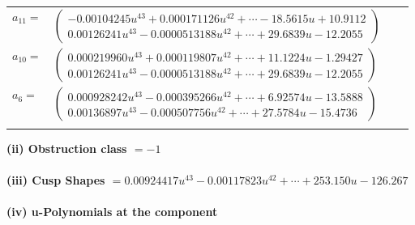 \documentclass[1p]{elsarticle_modified}
\theoremstyle{definition}
\begin{document}
\begin{tabular}{m{7pt} m{180pt} m{7pt} m{180pt} }
\flushright $a_{11}=$&$\begin{pmatrix}-0.00104245 u^{43}+0.000171126 u^{42}+\cdots-18.5615 u+10.9112\\0.00126241 u^{43}-0.0000513188 u^{42}+\cdots+29.6839 u-12.2055\end{pmatrix}$ \\
\flushright $a_{10}=$&$\begin{pmatrix}0.000219960 u^{43}+0.000119807 u^{42}+\cdots+11.1224 u-1.29427\\0.00126241 u^{43}-0.0000513188 u^{42}+\cdots+29.6839 u-12.2055\end{pmatrix}$ \\
\flushright $a_{6}=$&$\begin{pmatrix}0.000928242 u^{43}-0.000395266 u^{42}+\cdots+6.92574 u-13.5888\\0.00136897 u^{43}-0.000507756 u^{42}+\cdots+27.5784 u-15.4736\end{pmatrix}$\\&\end{tabular}
\flushleft \textbf{(ii) Obstruction class $= -1$}\\~\\
\flushleft \textbf{(iii) Cusp Shapes $= 0.00924417 u^{43}-0.00117823 u^{42}+\cdots+253.150 u-126.267$}\\~\\
\newpage\renewcommand{\arraystretch}{1}
\flushleft \textbf{(iv) u-Polynomials at the component}\newline \\
\end{document}
